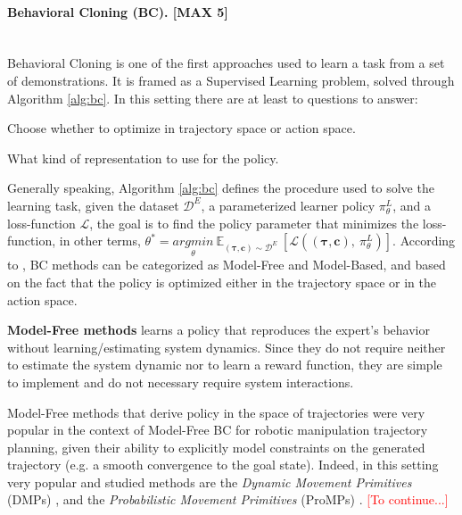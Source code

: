 \paragraph{Behavioral Cloning (BC). [MAX 5]} \mbox{} \\ 
Behavioral Cloning is one of the first approaches used to learn a task from a set of demonstrations. It is framed as a Supervised Learning problem, solved through Algorithm \ref{alg:bc}. In this setting there are at least to questions to answer: 
\begin{enumerate*}[label=\textbf{(\arabic*)}]
    \item Choose whether to optimize in trajectory space or action space.  
    \item What kind of representation to use for the policy.
\end{enumerate*}
Generally speaking, Algorithm \ref{alg:bc} defines the procedure used to solve the learning task, given the dataset $\mathcal{D}^{E}$, a parameterized learner policy $\pi^{L}_{\theta}$, and a loss-function $\mathcal{L}$, the goal is to find the policy parameter that minimizes the loss-function, in other terms, $\theta^{*} = \underset{\theta}{argmin} \ \mathbb{E}_{(\boldsymbol{\tau}, \mathbf{c}) \sim \mathcal{D}^{E}} \ [\mathcal{L}((\boldsymbol{\tau}, \mathbf{c}), \ \pi^{L}_{\theta})]$.
\newline According to \cite{osa2018algorithmic,zheng2021imitation_progress_taxonomies_opportunities}, BC methods can be categorized as Model-Free and Model-Based, and based on the fact that the policy is optimized either in the trajectory space or in the action space.
 

\textbf{Model-Free methods} learns a policy that reproduces the expert's behavior without learning/estimating system dynamics. Since they do not require neither to estimate the system dynamic nor to learn a reward function, they are simple to implement and do not necessary require system  interactions. 

Model-Free methods that derive policy in the space of trajectories were very popular in the context of Model-Free BC for robotic manipulation trajectory planning, given their ability to explicitly model constraints on the generated trajectory (e.g. a smooth convergence to the goal state). Indeed, in this setting very popular and studied methods are the \textit{Dynamic Movement Primitives} (DMPs) \cite{ijspeert2002learning,ijspeert2013dynamical}, and the \textit{Probabilistic Movement Primitives} (ProMPs) \cite{}. \textcolor{red}{[To continue...]}


